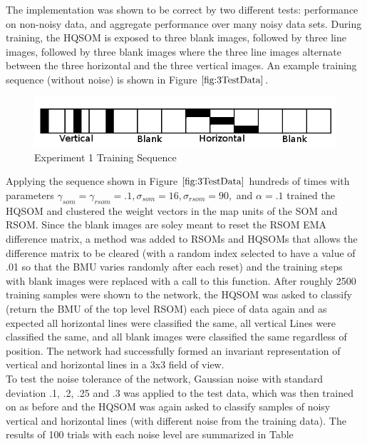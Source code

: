 \documentclass[a4paper,10pt]{article}
\begin{document}
The implementation was shown to be correct by two different tests: performance on non-noisy
data, and aggregate performance over many noisy data sets. During training, the HQSOM is exposed to
three blank images, followed by three line images, followed by three blank images where the three
line images alternate between the three horizontal and the three vertical images. An example
training sequence (without noise) is shown in Figure $\ref{fig:3TestData}$.
\begin{figure}[ht]
\begin{center} 
 \includegraphics[scale=.3]{./exp1_dataset.png}
\end{center} 
\caption{Experiment 1 Training Sequence}
\label{fig:3TestData}
\end{figure} 
Applying the sequence shown in Figure $\ref{fig:3TestData}$ hundreds of times with parameters
$\gamma_{som} = \gamma_{rsom} = .1, \sigma_{som}=16, \sigma_{rsom}=90,$ and $ \alpha = .1$
trained the HQSOM and clustered the weight vectors in the map units of the SOM and RSOM. Since the
blank images are soley meant to reset the RSOM EMA difference matrix, a method was added to RSOMs
and HQSOMs that allows the difference matrix to be cleared (with a random index selected to have a
value of .01 so that the BMU varies randomly after each reset) and the training steps with blank
images were replaced with a call to this function. After roughly 2500 training samples were shown to
the network, the HQSOM was asked to classify (return the BMU of the top level RSOM) each piece of
data again and as expected all horizontal lines were classified the same, all vertical Lines were
classified the same, and all blank images were classified the same regardless of position.  The
network had successfully formed an invariant representation of vertical and horizontal lines in a
3x3 field of view.
\\
To test the noise tolerance of the network, Gaussian noise with standard deviation .1, .2, .25 and
.3 was applied to the test data, which was then trained on as before and the HQSOM was again asked
to classify samples of noisy vertical and horizontal lines (with different noise from the training
data).  The results of 100 trials with each noise level are summarized in Table
\end{document}
